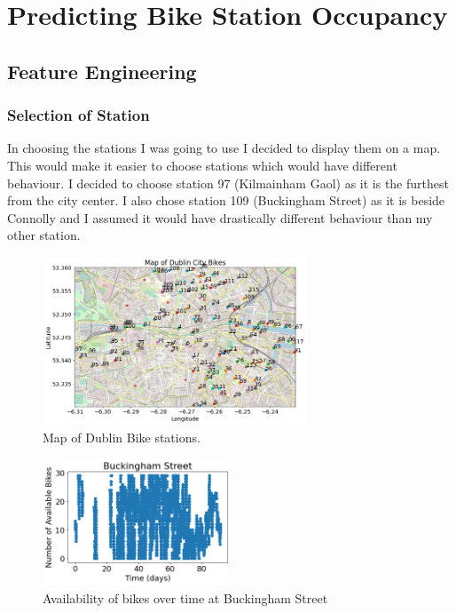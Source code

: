 \maketitle


\section{Predicting Bike Station Occupancy}
\subsection{Feature Engineering}
\subsubsection{Selection of Station}
In choosing the stations I was going to use I decided to display them on a map.
This would make it easier to choose stations which would have different behaviour.
I decided to choose station 97 (Kilmainham Gaol) as it is the furthest from the city center.
I also chose station 109 (Buckingham Street) as it is beside Connolly and I assumed it would have drastically different behaviour than my other station.

\begin{figure}[H]
\centering
\includegraphics[width=0.7\textwidth]{images/map.png}
\caption{Map of Dublin Bike stations.}
\end{figure}

\begin{figure}[H]
    \centering
    \includegraphics[width=0.5\textwidth]{images/buckingham data.png}
    \caption{Availability of bikes over time at Buckingham Street}
    \end{figure}


